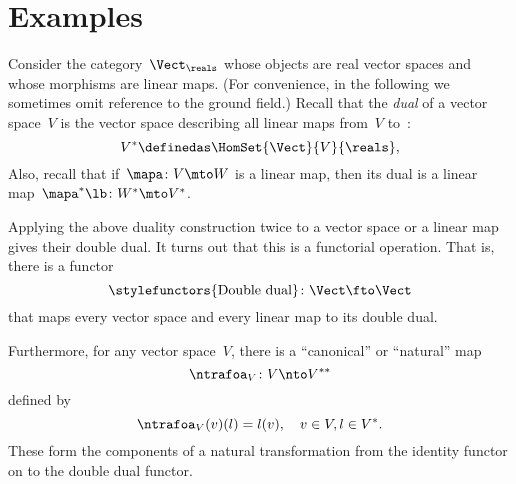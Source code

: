 \section{Examples}

\begin{example}
    \label{ex:Vect}
    Consider the category~$\Vect_{\reals}$ whose objects are real vector spaces and whose morphisms are linear maps.
    (For convenience, in the following we sometimes omit reference to the ground field.)
    Recall that the \emph{dual} of a vector space~$V$ is the vector space describing all linear maps from~$V$ to~\reals:
    \begin{equation}
        \label{eq:dual-vector-space}
        V^* \definedas \HomSet{\Vect}{V}{\reals},
    \end{equation}
    Also, recall that if~$\mapa\colon V \mto W$ is a linear map, then its dual is a linear map~$\mapa^* \lb  \colon W^* \mto V^*$.

    Applying the above duality construction twice to a vector space or a linear map gives their double dual.
    It turns out that this is a functorial operation.
    That is, there is a functor
    \begin{equation}
        \label{eq:double-dual-functor}
        \text{\stylefunctors{Double dual}}\colon \Vect \fto \Vect
    \end{equation}
    that maps every vector space and every linear map to its double dual.

    Furthermore, for any vector space~$V$, there is a ``canonical'' or ``natural'' map~
    \begin{equation}
        \ntrafoa_V \colon V \nto V^{**}
    \end{equation}
    defined by
    \begin{equation}
        \label{eq:natural-trafo-to-double-dual}
        \ntrafoa_V(v)(l) = l(v), \quad  v \in V, l \in V^*.
    \end{equation}
    These form the components of a natural transformation from the identity functor on \Vect to the double dual functor.
    \begin{center}
    \end{center}
\end{example}


